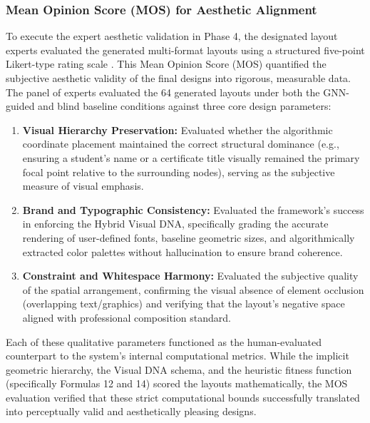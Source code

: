 \begin{refsection}
\subsubsection{Mean Opinion Score (MOS) for Aesthetic Alignment}
To execute the expert aesthetic validation in Phase 4, the designated layout experts evaluated the generated multi-format layouts using a structured five-point Likert-type rating scale \cite{likert1932technique}. This Mean Opinion Score (MOS) quantified the subjective aesthetic validity of the final designs into rigorous, measurable data. The panel of experts evaluated the 64 generated layouts under both the GNN-guided and blind baseline conditions against three core design parameters:
\begin{enumerate}
    \item \textbf{Visual Hierarchy Preservation:} Evaluated whether the algorithmic coordinate placement maintained the correct structural dominance (e.g., ensuring a student's name or a certificate title visually remained the primary focal point relative to the surrounding nodes), serving as the subjective measure of visual emphasis. \cite{ODonovan2014Layouts}
    \item \textbf{Brand and Typographic Consistency:} Evaluated the framework's success in enforcing the Hybrid Visual DNA, specifically grading the accurate rendering of user-defined fonts, baseline geometric sizes, and algorithmically extracted color palettes without hallucination to ensure brand coherence. \cite{wheeler2013designing}
    \item \textbf{Constraint and Whitespace Harmony:} Evaluated the subjective quality of the spatial arrangement, confirming the visual absence of element occlusion (overlapping text/graphics) and verifying that the layout's negative space aligned with professional composition standard. \cite{ODonovan2014Layouts, zhou2022cglgan}
\end{enumerate}
Each of these qualitative parameters functioned as the human-evaluated counterpart to the system's internal computational metrics. While the implicit geometric hierarchy, the Visual DNA schema, and the heuristic fitness function (specifically Formulas 12 and 14) scored the layouts mathematically, the MOS evaluation verified that these strict computational bounds successfully translated into perceptually valid and aesthetically pleasing designs.


\end{refsection}
